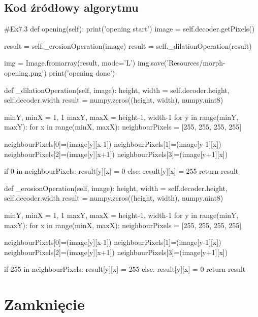 \documentclass[a4paper,12pt]{book}
\begin{document}
\subsection{Kod źródłowy algorytmu}
\begin{python}
#Ex7.3
def opening(self):
	print('opening start')
	image = self.decoder.getPixels()
	
	result = self._erosionOperation(image)
	result = self._dilationOperation(result)
	
	img = Image.fromarray(result, mode='L')
	img.save('Resources/morph-opening.png')
	print('opening done')
	
def _dilationOperation(self, image):
	height, width = self.decoder.height, self.decoder.width
	result = numpy.zeros((height, width), numpy.uint8)
	
	minY, minX = 1, 1
	maxY, maxX = height-1, width-1
	for y in range(minY, maxY):
		for x in range(minX, maxX):
			neighbourPixels = [255, 255, 255, 255]
			
			neighbourPixels[0]=(image[y][x-1])
			neighbourPixels[1]=(image[y-1][x])
			neighbourPixels[2]=(image[y][x+1])
			neighbourPixels[3]=(image[y+1][x])
			
			if 0 in neighbourPixels:
				result[y][x] = 0
			else:
				result[y][x] = 255
	return result
	
def _erosionOperation(self, image):
	height, width = self.decoder.height, self.decoder.width
	result = numpy.zeros((height, width), numpy.uint8)
	
	minY, minX = 1, 1
	maxY, maxX = height-1, width-1
	for y in range(minY, maxY):
		for x in range(minX, maxX):
			neighbourPixels = [255, 255, 255, 255]
			
			neighbourPixels[0]=(image[y][x-1])
			neighbourPixels[1]=(image[y-1][x])
			neighbourPixels[2]=(image[y][x+1])
			neighbourPixels[3]=(image[y+1][x])
			
			if 255 in neighbourPixels:
				result[y][x] = 255
			else:
				result[y][x] = 0
	return result
\end{python}
\section{Zamknięcie}
\end{document}
